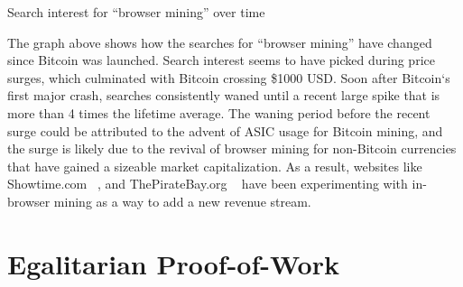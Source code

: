 \begin{center}
	\caption{Search interest for ``browser mining'' over time}
\end{center}

The graph above shows how the searches for ``browser mining'' have changed since Bitcoin was launched. Search interest seems to have picked during price surges, which culminated with Bitcoin crossing \$1000 USD. Soon after Bitcoin`s first major crash, searches consistently waned until a recent large spike that is more than 4 times the lifetime average. The waning period before the recent surge could be attributed to the advent of ASIC usage for Bitcoin mining, and the surge is likely due to the revival of browser mining for non-Bitcoin currencies that have gained a sizeable market capitalization. As a result, websites like Showtime.com ~\cite{showtimehive}, and ThePirateBay.org ~\cite{piratesbayhive} have been experimenting with in-browser mining as a way to add a new revenue stream.

\section{Egalitarian Proof-of-Work}

